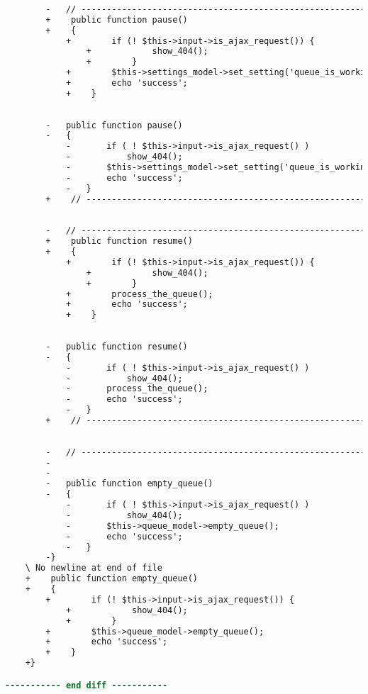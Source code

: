 \begin{lstlisting}[language=diff, caption=Perubahan pada kode Queue.php]
		
		-	// ------------------------------------------------------------------------
		+    public function pause()
		+    {
			+        if (! $this->input->is_ajax_request()) {
				+            show_404();
				+        }
			+        $this->settings_model->set_setting('queue_is_working', '0');
			+        echo 'success';
			+    }
		
		
		-	public function pause()
		-	{
			-		if ( ! $this->input->is_ajax_request() )
			-			show_404();
			-		$this->settings_model->set_setting('queue_is_working','0');
			-		echo 'success';
			-	}
		+    // ------------------------------------------------------------------------
		
		
		-	// ------------------------------------------------------------------------
		+    public function resume()
		+    {
			+        if (! $this->input->is_ajax_request()) {
				+            show_404();
				+        }
			+        process_the_queue();
			+        echo 'success';
			+    }
		
		
		-	public function resume()
		-	{
			-		if ( ! $this->input->is_ajax_request() )
			-			show_404();
			-		process_the_queue();
			-		echo 'success';
			-	}
		+    // ------------------------------------------------------------------------
		
		
		-	// ------------------------------------------------------------------------
		-
		-
		-	public function empty_queue()
		-	{
			-		if ( ! $this->input->is_ajax_request() )
			-			show_404();
			-		$this->queue_model->empty_queue();
			-		echo 'success';
			-	}
		-}
	\ No newline at end of file
	+    public function empty_queue()
	+    {
		+        if (! $this->input->is_ajax_request()) {
			+            show_404();
			+        }
		+        $this->queue_model->empty_queue();
		+        echo 'success';
		+    }
	+}

----------- end diff -----------
\end{lstlisting}

